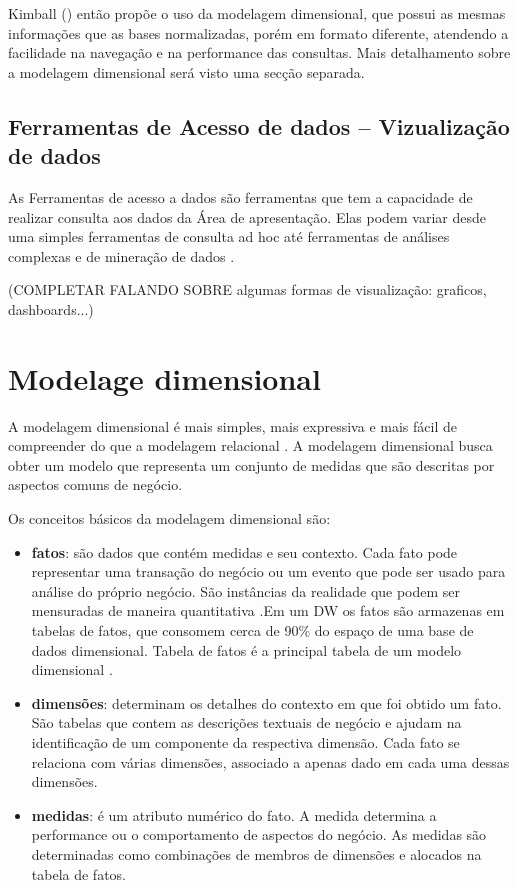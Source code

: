%

Kimball (\citeyear{kimball2002}) então propõe o uso da modelagem dimensional, que possui as mesmas informações que as bases normalizadas, porém em formato diferente, atendendo a facilidade na navegação e na performance das consultas. Mais detalhamento sobre a modelagem dimensional será visto uma secção separada.

%

\subsection{Ferramentas de Acesso de dados – Vizualização de dados}

%

As Ferramentas de acesso a dados são ferramentas que tem a capacidade de realizar consulta aos dados da Área de apresentação. Elas podem variar desde uma simples ferramentas de consulta ad hoc até ferramentas de análises complexas e de mineração de dados \cite{kimball2002}.

(COMPLETAR FALANDO SOBRE algumas formas de visualização: graficos, dashboards...)

%

\section{Modelage dimensional}

%

A modelagem dimensional é mais simples, mais expressiva e mais fácil de compreender do que a modelagem relacional \cite{ballard1998}. A modelagem dimensional busca obter um modelo que representa um conjunto de medidas que são descritas por aspectos comuns de negócio.

%

Os conceitos básicos da modelagem dimensional são:

\begin{itemize}
	\item \textbf{fatos}: são dados que contém medidas e seu contexto. Cada fato pode representar uma transação do negócio ou um evento que pode ser usado para análise do próprio negócio. São instâncias da realidade  que podem ser mensuradas de maneira quantitativa \cite{kiball2002}.Em um DW os fatos são armazenas em tabelas de fatos, que consomem cerca de 90\% do espaço de uma base de dados dimensional. Tabela de fatos é a principal tabela de um modelo dimensional \cite{kimball2002} \cite{ballard1998}.
	\item \textbf{dimensões}: determinam os detalhes do contexto em que foi obtido um fato. São tabelas que contem as descrições textuais de negócio e ajudam na identificação de um componente da respectiva dimensão. Cada fato se relaciona com várias dimensões, associado a apenas dado em cada uma dessas dimensões.
	\item \textbf{medidas}: é um atributo numérico do fato. A medida determina a performance ou o comportamento de aspectos do negócio. As medidas são determinadas como combinações de membros de dimensões e alocados na tabela de fatos.

\end{itemize}

